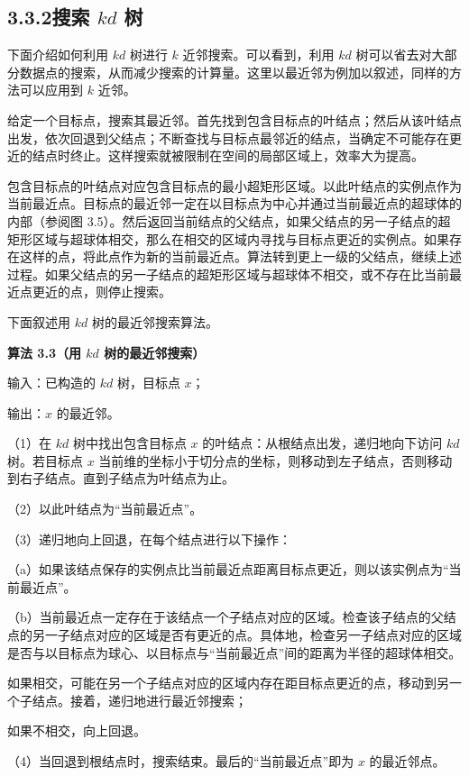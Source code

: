 \documentclass[UTF8, 12pt, fontset=fandol, oneside]{ctexart}
\begin{document}
\subsection*{3.3.2\quad 搜索 $kd$ 树}

下面介绍如何利用 $kd$ 树进行 $k$ 近邻搜索。可以看到，利用 $kd$ 树可以省去对大部分数据点的搜索，从而减少搜索的计算量。这里以最近邻为例加以叙述，同样的方法可以应用到 $k$ 近邻。

给定一个目标点，搜索其最近邻。首先找到包含目标点的叶结点；然后从该叶结点出发，依次回退到父结点；不断查找与目标点最邻近的结点，当确定不可能存在更近的结点时终止。这样搜索就被限制在空间的局部区域上，效率大为提高。

包含目标点的叶结点对应包含目标点的最小超矩形区域。以此叶结点的实例点作为当前最近点。目标点的最近邻一定在以目标点为中心并通过当前最近点的超球体的内部（参阅图 3.5）。然后返回当前结点的父结点，如果父结点的另一子结点的超矩形区域与超球体相交，那么在相交的区域内寻找与目标点更近的实例点。如果存在这样的点，将此点作为新的当前最近点。算法转到更上一级的父结点，继续上述过程。如果父结点的另一子结点的超矩形区域与超球体不相交，或不存在比当前最近点更近的点，则停止搜索。

下面叙述用 $kd$ 树的最近邻搜索算法。

\noindent\textbf{算法 3.3（用 $kd$ 树的最近邻搜索）}

\noindent 输入：已构造的 $kd$ 树，目标点 $x$；

\noindent 输出：$x$ 的最近邻。

（1）在 $kd$ 树中找出包含目标点 $x$ 的叶结点：从根结点出发，递归地向下访问 $kd$ 树。若目标点 $x$ 当前维的坐标小于切分点的坐标，则移动到左子结点，否则移动到右子结点。直到子结点为叶结点为止。

（2）以此叶结点为“当前最近点”。

（3）递归地向上回退，在每个结点进行以下操作：

（a）如果该结点保存的实例点比当前最近点距离目标点更近，则以该实例点为“当前最近点”。

（b）当前最近点一定存在于该结点一个子结点对应的区域。检查该子结点的父结点的另一子结点对应的区域是否有更近的点。具体地，检查另一子结点对应的区域是否与以目标点为球心、以目标点与“当前最近点”间的距离为半径的超球体相交。

如果相交，可能在另一个子结点对应的区域内存在距目标点更近的点，移动到另一个子结点。接着，递归地进行最近邻搜索；

如果不相交，向上回退。

（4）当回退到根结点时，搜索结束。最后的“当前最近点”即为 $x$ 的最近邻点。
\end{document}
